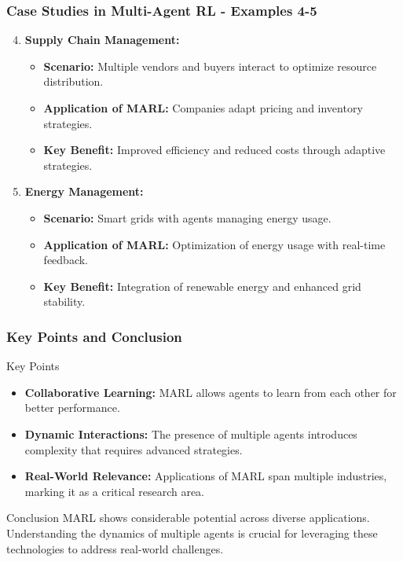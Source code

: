 \documentclass[aspectratio=169]{beamer}
\begin{document}
\begin{frame}[fragile]
    \frametitle{Case Studies in Multi-Agent RL - Examples 4-5}
    \begin{enumerate}
        \setcounter{enumi}{3}
        \item \textbf{Supply Chain Management:}
        \begin{itemize}
            \item \textbf{Scenario:} Multiple vendors and buyers interact to optimize resource distribution.
            \item \textbf{Application of MARL:} Companies adapt pricing and inventory strategies.
            \item \textbf{Key Benefit:} Improved efficiency and reduced costs through adaptive strategies.
        \end{itemize}

        \item \textbf{Energy Management:}
        \begin{itemize}
            \item \textbf{Scenario:} Smart grids with agents managing energy usage.
            \item \textbf{Application of MARL:} Optimization of energy usage with real-time feedback.
            \item \textbf{Key Benefit:} Integration of renewable energy and enhanced grid stability.
        \end{itemize}
    \end{enumerate}
\end{frame}

\begin{frame}[fragile]
    \frametitle{Key Points and Conclusion}
    \begin{block}{Key Points}
        \begin{itemize}
            \item \textbf{Collaborative Learning:} MARL allows agents to learn from each other for better performance.
            \item \textbf{Dynamic Interactions:} The presence of multiple agents introduces complexity that requires advanced strategies.
            \item \textbf{Real-World Relevance:} Applications of MARL span multiple industries, marking it as a critical research area.
        \end{itemize}
    \end{block}

    \begin{block}{Conclusion}
        MARL shows considerable potential across diverse applications. Understanding the dynamics of multiple agents is crucial for leveraging these technologies to address real-world challenges.
    \end{block}
\end{frame}
\end{document}
